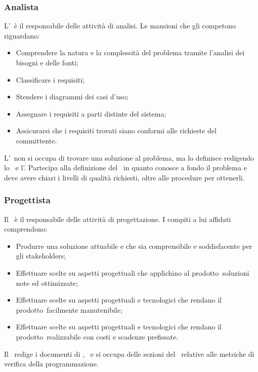\documentclass[../NormeProgetto.tex]{subfiles}
\begin{document}
		\subsubsection{Analista}
			L'\analista\ è il responsabile delle attività di analisi. Le mansioni che gli competono riguardano:
			\begin{itemize}
				\item Comprendere la natura e la complessità del problema tramite l'analisi dei bisogni e delle fonti;
				\item Classificare i requisiti;
				\item Stendere i diagrammi dei casi d'uso;
				\item Assegnare i requisiti a parti distinte del sistema;
				\item Assicurarsi che i requisiti trovati siano conformi alle richieste del committente.
			\end{itemize}
			L'\analista\ non si occupa di trovare una soluzione al problema, ma lo definisce redigendo lo \studiodifattibilita\ e l'\analisideirequisiti. Partecipa alla definizione del \pianodiqualifica\ in quanto conosce a fondo il problema e deve avere chiari i livelli di qualità richiesti, oltre alle procedure per ottenerli. 
		\subsubsection{Progettista}
			Il \progettista\ è il responsabile delle attività di progettazione. I compiti a lui affidati comprendono:
			\begin{itemize}
				\item Produrre una soluzione attuabile e che sia comprensibile e soddisfacente per gli stakeholders;
				\item Effettuare scelte su aspetti progettuali che applichino al prodotto\g\ soluzioni note ed ottimizzate;
				\item Effettuare scelte su aspetti progettuali e tecnologici che rendano il prodotto\g\ facilmente manutenibile;
				\item Effettuare scelte su aspetti progettuali e tecnologici che rendano il prodotto\g\ realizzabile con costi e scadenze prefissate.
			\end{itemize}
			Il \progettista\ redige i documenti di \specificatecnica, \ e si occupa delle sezioni del \pianodiqualifica\ relative alle metriche di verifica della programmazione.
\end{document}
